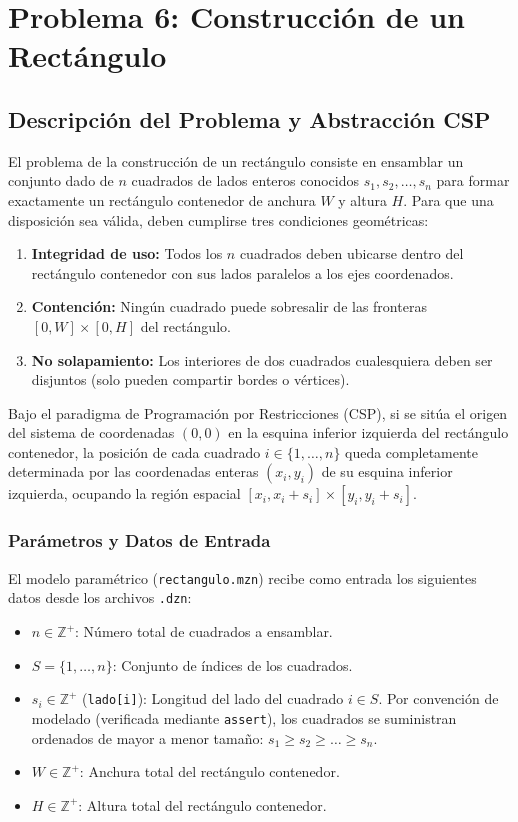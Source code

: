 \section{Problema 6: Construcción de un Rectángulo}

\subsection{Descripción del Problema y Abstracción CSP}
El problema de la construcción de un rectángulo consiste en ensamblar un conjunto dado de $n$ cuadrados de lados enteros conocidos $s_1, s_2, \dots, s_n$ para formar exactamente un rectángulo contenedor de anchura $W$ y altura $H$. Para que una disposición sea válida, deben cumplirse tres condiciones geométricas:
\begin{enumerate}
    \item \textbf{Integridad de uso:} Todos los $n$ cuadrados deben ubicarse dentro del rectángulo contenedor con sus lados paralelos a los ejes coordenados.
    \item \textbf{Contención:} Ningún cuadrado puede sobresalir de las fronteras $[0, W] \times [0, H]$ del rectángulo.
    \item \textbf{No solapamiento:} Los interiores de dos cuadrados cualesquiera deben ser disjuntos (solo pueden compartir bordes o vértices).
\end{enumerate}

Bajo el paradigma de Programación por Restricciones (CSP), si se sitúa el origen del sistema de coordenadas $(0, 0)$ en la esquina inferior izquierda del rectángulo contenedor, la posición de cada cuadrado $i \in \{1, \dots, n\}$ queda completamente determinada por las coordenadas enteras $(x_i, y_i)$ de su esquina inferior izquierda, ocupando la región espacial $[x_i, x_i + s_i] \times [y_i, y_i + s_i]$.

\subsubsection{Parámetros y Datos de Entrada}
El modelo paramétrico (\texttt{rectangulo.mzn}) recibe como entrada los siguientes datos desde los archivos \texttt{.dzn}:
\begin{itemize}
    \item $n \in \mathbb{Z}^+$: Número total de cuadrados a ensamblar.
    \item $S = \{1, \dots, n\}$: Conjunto de índices de los cuadrados.
    \item $s_i \in \mathbb{Z}^+$ (\texttt{lado[i]}): Longitud del lado del cuadrado $i \in S$. Por convención de modelado (verificada mediante \texttt{assert}), los cuadrados se suministran ordenados de mayor a menor tamaño: $s_1 \ge s_2 \ge \dots \ge s_n$.
    \item $W \in \mathbb{Z}^+$: Anchura total del rectángulo contenedor.
    \item $H \in \mathbb{Z}^+$: Altura total del rectángulo contenedor.
\end{itemize}

